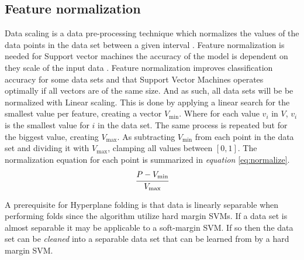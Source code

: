 \documentclass[a4paper,twoside]{bth}
\begin{document}
\subsection{Feature normalization}
Data scaling is a data pre-processing technique which normalizes the values of the data points in the data set between a given interval \cite{featurescaling-org}. Feature normalization is needed for Support vector machines the accuracy of the model is dependent on they scale of the input data \cite{featurescaling-svm}. Feature normalization improves classification accuracy for some data sets \cite{featurescaling-br} and that Support Vector Machines operates optimally if all vectors are of the same size\cite{1077809}. And as such, all data sets will be be normalized with Linear scaling. This is done by applying a linear search for the smallest value per feature, creating a vector $V_{\text{min}}$. Where for each value $v_i$ in $V$, $v_i$ is the smallest value for $i$ in the data set. The same process is repeated but for the biggest value, creating $V_{\text{max}}$. As subtracting $V_{\text{min}}$ from each point in the data set and dividing it with $V_{\text{max}}$, clamping all values between $[0,1]$. The normalization equation for each point is summarized in \textit{equation} \ref{eq:normalize}. 
\begin{equation}\label{eq:normalize}
\begin{aligned}
     \cfrac{P - V_{\text{min}}}{{V_\text{max}}}
\end{aligned}
\end{equation} 

\par A prerequisite for Hyperplane folding is that data is linearly separable when performing folds since the algorithm utilize hard margin SVMs. If a data set is almost separable it may be applicable to a soft-margin SVM. If so then the data set can be \textit{cleaned} into a separable data set that can be learned from by a hard margin SVM.
\end{document}
